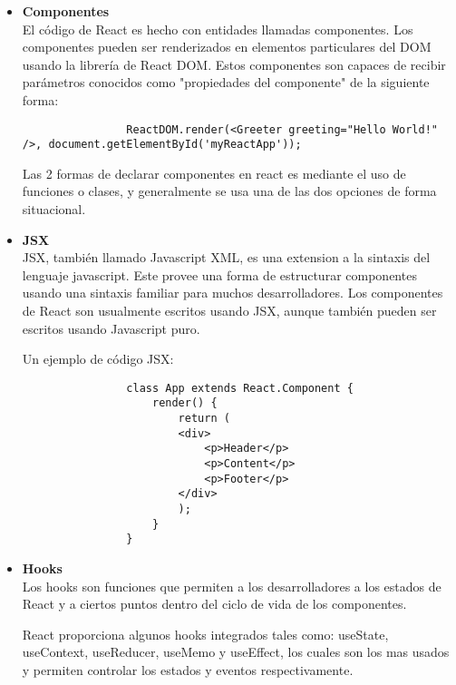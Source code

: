 \begin{itemize}
    \item \textbf{Componentes} \hfill \\

          El código de React es hecho con entidades llamadas componentes. Los componentes pueden ser renderizados en elementos particulares del DOM usando la librería de React DOM. Estos componentes son capaces de recibir parámetros conocidos como "propiedades del componente" de la siguiente forma: \hfill \\

          \begin{lstlisting}
                ReactDOM.render(<Greeter greeting="Hello World!" />, document.getElementById('myReactApp'));
            \end{lstlisting}

          Las 2 formas de declarar componentes en react es mediante el uso de funciones o clases, y generalmente se usa una de las dos opciones de forma situacional.

    \item \textbf{JSX} \hfill \\

          JSX, también llamado Javascript XML, es una extension a la sintaxis del lenguaje javascript. Este provee una forma de estructurar componentes usando una sintaxis familiar para muchos desarrolladores. Los componentes de React son usualmente escritos usando JSX, aunque también pueden ser escritos usando Javascript puro.

          Un ejemplo de código JSX:

          \begin{lstlisting}
                class App extends React.Component {
                    render() {
                        return (
                        <div>
                            <p>Header</p>
                            <p>Content</p>
                            <p>Footer</p>
                        </div>
                        );
                    }
                }
            \end{lstlisting}

    \item \textbf{Hooks} \hfill \\

          Los hooks son funciones que permiten a los desarrolladores  a los estados de React y a ciertos puntos dentro del ciclo de vida de los componentes.

          React proporciona algunos hooks integrados tales como: useState, useContext, useReducer, useMemo y useEffect, los cuales son los mas usados y permiten controlar los estados y eventos respectivamente.


\end{itemize}

